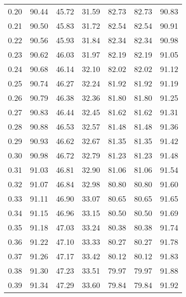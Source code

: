 \begin{tabular}{|c|c|c|c|c|c|c|}
      0.20 &     90.44 &     45.72 &      31.59 &   82.73 &      82.73 &         90.83 \\
      0.21 &     90.50 &     45.83 &      31.72 &   82.54 &      82.54 &         90.91 \\
      0.22 &     90.56 &     45.93 &      31.84 &   82.34 &      82.34 &         90.98 \\
      0.23 &     90.62 &     46.03 &      31.97 &   82.19 &      82.19 &         91.05 \\
      0.24 &     90.68 &     46.14 &      32.10 &   82.02 &      82.02 &         91.12 \\
      0.25 &     90.74 &     46.27 &      32.24 &   81.92 &      81.92 &         91.19 \\
      0.26 &     90.79 &     46.38 &      32.36 &   81.80 &      81.80 &         91.25 \\
      0.27 &     90.83 &     46.44 &      32.45 &   81.62 &      81.62 &         91.31 \\
      0.28 &     90.88 &     46.53 &      32.57 &   81.48 &      81.48 &         91.36 \\
      0.29 &     90.93 &     46.62 &      32.67 &   81.35 &      81.35 &         91.42 \\
      0.30 &     90.98 &     46.72 &      32.79 &   81.23 &      81.23 &         91.48 \\
      0.31 &     91.03 &     46.81 &      32.90 &   81.06 &      81.06 &         91.54 \\
      0.32 &     91.07 &     46.84 &      32.98 &   80.80 &      80.80 &         91.60 \\
      0.33 &     91.11 &     46.90 &      33.07 &   80.65 &      80.65 &         91.65 \\
      0.34 &     91.15 &     46.96 &      33.15 &   80.50 &      80.50 &         91.69 \\
      0.35 &     91.18 &     47.03 &      33.24 &   80.38 &      80.38 &         91.74 \\
      0.36 &     91.22 &     47.10 &      33.33 &   80.27 &      80.27 &         91.78 \\
      0.37 &     91.26 &     47.17 &      33.42 &   80.12 &      80.12 &         91.83 \\
      0.38 &     91.30 &     47.23 &      33.51 &   79.97 &      79.97 &         91.88 \\
      0.39 &     91.34 &     47.29 &      33.60 &   79.84 &      79.84 &         91.92 \\

\end{tabular}
